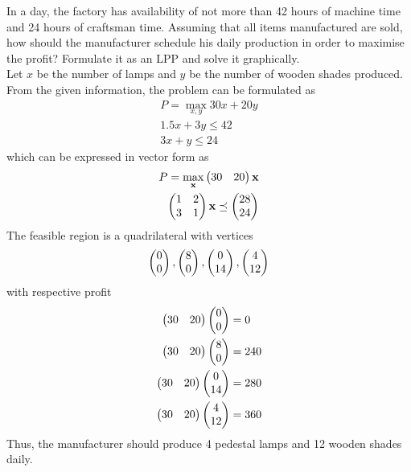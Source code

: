 \documentclass[journal,12pt,twocolumn]{IEEEtran}
\renewcommand\thesection{\arabic{section}}
\begin{document}
\begin{enumerate}[label=\thesection.\arabic*.,ref=\thesection.\theenumi]
In a day, the factory has availability of not more than 42 hours of machine time and 24 hours of craftsman time.
Assuming that all items manufactured are sold, how should the manufacturer schedule his daily production in order to maximise the profit? Formulate it as an LPP and solve it graphically.
\\
\solution Let $x$ be the number of lamps and $y$ be the number of wooden shades produced.  From the given information, the problem can be formulated as
\begin{align}
	P = \max_{x,y}30x+20y
	\\
1.5x+3y \le 42
\\
3x+y \le 24
\end{align}
which can be expressed in vector form as
\begin{align}
	P = \max_{\mathbf{x}}\begin{pmatrix}30 &20\end{pmatrix}\mathbf{x}
	\\
	\begin{pmatrix}1 &2 \\ 3 & 1\end{pmatrix} \mathbf{x}\preceq \begin{pmatrix}28 \\ 24\end{pmatrix}
\end{align}
The feasible region is a quadrilateral with vertices
\begin{align}
\begin{pmatrix}0 \\ 0\end{pmatrix},
\begin{pmatrix}8 \\ 0\end{pmatrix},
\begin{pmatrix}0 \\ 14\end{pmatrix},
\begin{pmatrix}4 \\ 12\end{pmatrix}
\end{align}
with respective profit
\begin{align}
	\begin{pmatrix}30 &20\end{pmatrix}\begin{pmatrix}0 \\ 0\end{pmatrix} &= 0 \\
	\begin{pmatrix}30 &20\end{pmatrix}\begin{pmatrix}8 \\ 0\end{pmatrix} &= 240 \\
	\begin{pmatrix}30 &20\end{pmatrix}\begin{pmatrix}0 \\ 14\end{pmatrix} &= 280 \\
	\begin{pmatrix}30 &20\end{pmatrix}\begin{pmatrix}4 \\ 12\end{pmatrix} &= 360
\end{align}
Thus, the manufacturer should produce 4 pedestal lamps and 12 wooden shades daily.
    

\end{enumerate}
\end{document}
